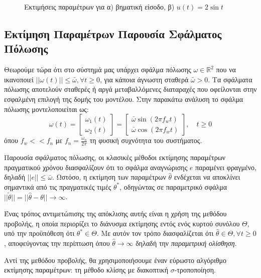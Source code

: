 \documentclass[a4paper,12pt]{article}
\begin{document}
\begin{figure}[htbp]
\begin{subfigure}[b]{0.45\textwidth}
    \caption{}
    \label{fig:task1_parameter_estimations_sinusoidal}
  \end{subfigure}
  \caption{Εκτιμήσεις παραμέτρων για α) βηματική είσοδο, β) $u(t) = 2 \sin t$}
  \label{fig:task1_parameter_estimations}
\end{figure}


\subsection*{Εκτίμηση Παραμέτρων Παρουσία Σφάλματος Πόλωσης}
Θεωρούμε τώρα ότι στο σύστημά μας υπάρχει σφάλμα πόλωσης $\omega \in \mathbb{R}^2$ που να ικανοποιεί
$||\omega(t)|| \leq \bar{\omega}, \forall t \geq 0$, για κάποια άγνωστη σταθερά $\bar{\omega} > 0$.
Τα σφάλματα πόλωσης αποτελούν σταθερές ή αργά μεταβαλλόμενες διαταραχές που οφείλονται στην εσφαλμένη 
επιλογή της δομής του μοντέλου. Στην παρακάτω ανάλυση το σφάλμα πόλωσης μοντελοποιείται ως:
\begin{equation}
    \omega(t) = 
    \begin{bmatrix}
        \omega_1(t) \\
        \omega_2(t)
    \end{bmatrix} = 
    \begin{bmatrix}
        \bar{\omega} \sin(2 \pi f_w t) \\
        \bar{\omega} \cos(2 \pi f_w t)
    \end{bmatrix}, \quad t \geq 0
    \label{eq:bias_error}
\end{equation}
όπου $f_w << f_n$ με $f_n = \frac{\omega_n}{2 \pi}$ τη φυσική συχνότητα του συστήματος.

Παρουσία σφάλματος πόλωσης, οι κλασικές μέθοδοι εκτίμησης παραμέτρων πραγματικού χρόνου διασφαλίζουν ότι 
το σφάλμα αναγνώρισης $e$ παραμένει φραγμένο, δηλαδή $||e|| \leq \bar{\omega}$. Ωστόσο, η εκτίμηση των
παραμέτρων $\hat{\theta}$ ενδέχεται να αποκλίνει σημαντικά από τις πραγματικές τιμές $\theta^*$, 
οδηγώντας σε παραμετρικό σφάλμα $||\tilde{\theta}|| = ||\hat{\theta} - \theta|| \to \infty$.

Ένας τρόπος αντιμετώπισης της απόκλισης αυτής είναι η χρήση της μεθόδου προβολής, η οποία περιορίζει το 
διάνυσμα εκτίμησης εντός ενός κυρτού συνόλου $\Theta$, υπό την προϋπόθεση ότι $\theta^* \in \Theta$. 
Με αυτόν τον τρόπο διασφαλίζεται ότι $\hat{\theta} \in \Theta, \forall t \ge 0$, αποφεύγοντας την περίπτωση 
όπου $\hat{\theta} \to \infty$ δηλαδή την \textit{παραμετρική ολίσθηση}.

Αντί της μεθόδου προβολής, θα χρησιμοποιήσουμε έναν εύρωστο αλγόριθμο εκτίμησης παραμέτρων: 
τη μέθοδο κλίσης με διακοπτική $\sigma$-τροποποίηση.
\end{document}

